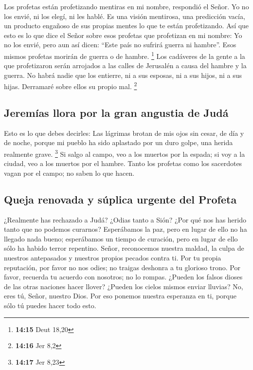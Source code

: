  Los profetas están profetizando mentiras en mi nombre,
respondió el Señor. Yo no los envié, ni los elegí, ni les hablé. Es una
visión mentirosa, una predicción vacía, un producto engañoso de sus
propias mentes lo que te están profetizando.  Así que
esto es lo que dice el Señor sobre esos profetas que profetizan en mi
nombre: Yo no los envié, pero aun así dicen: ``Este país no sufrirá
guerra ni hambre''. Esos mismos profetas morirán de guerra o de hambre.
\footnote{\textbf{14:15} Deut 18,20}  Los cadáveres de la
gente a la que profetizaron serán arrojados a las calles de Jerusalén a
causa del hambre y la guerra. No habrá nadie que los entierre, ni a sus
esposas, ni a sus hijos, ni a sus hijas. Derramaré sobre ellos su propio
mal. \footnote{\textbf{14:16} Jer 8,2}

\hypertarget{jeremuxedas-llora-por-la-gran-angustia-de-juduxe1}{%
\subsection{Jeremías llora por la gran angustia de
Judá}\label{jeremuxedas-llora-por-la-gran-angustia-de-juduxe1}}

 Esto es lo que debes decirles: Las lágrimas brotan de
mis ojos sin cesar, de día y de noche, porque mi pueblo ha sido
aplastado por un duro golpe, una herida realmente grave. \footnote{\textbf{14:17}
  Jer 8,23}  Si salgo al campo, veo a los muertos por la
espada; si voy a la ciudad, veo a los muertos por el hambre. Tanto los
profetas como los sacerdotes vagan por el campo; no saben lo que hacen.

\hypertarget{queja-renovada-y-suxfaplica-urgente-del-profeta}{%
\subsection{Queja renovada y súplica urgente del
Profeta}\label{queja-renovada-y-suxfaplica-urgente-del-profeta}}

 ¿Realmente has rechazado a Judá? ¿Odias tanto a Sión?
¿Por qué nos has herido tanto que no podemos curarnos? Esperábamos la
paz, pero en lugar de ello no ha llegado nada bueno; esperábamos un
tiempo de curación, pero en lugar de ello sólo ha habido terror
repentino.  Señor, reconocemos nuestra maldad, la culpa
de nuestros antepasados y nuestros propios pecados contra ti.
 Por tu propia reputación, por favor no nos odies; no
traigas deshonra a tu glorioso trono. Por favor, recuerda tu acuerdo con
nosotros; no lo rompas.  ¿Pueden los falsos dioses de las
otras naciones hacer llover? ¿Pueden los cielos mismos enviar lluvias?
No, eres tú, Señor, nuestro Dios. Por eso ponemos nuestra esperanza en
ti, porque sólo tú puedes hacer todo esto.

